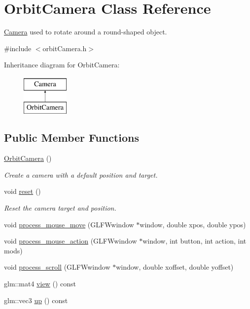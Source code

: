 \hypertarget{classOrbitCamera}{}\section{Orbit\+Camera Class Reference}
\label{classOrbitCamera}


\hyperlink{classCamera}{Camera} used to rotate around a round-\/shaped object.  




{\ttfamily \#include $<$orbit\+Camera.\+h$>$}

Inheritance diagram for Orbit\+Camera\+:\begin{figure}[H]
\begin{center}
\leavevmode
\includegraphics[height=2.000000cm]{classOrbitCamera}
\end{center}
\end{figure}
\subsection*{Public Member Functions}
\begin{DoxyCompactItemize}
\item 
\hyperlink{classOrbitCamera_ae87a8ab83042c47dac97a41ab4eb9e8c}{Orbit\+Camera} ()
\begin{DoxyCompactList}\small\item\em Create a camera with a default position and target. \end{DoxyCompactList}\item 
void \hyperlink{classOrbitCamera_a022751aa06693232844732adb00e7d71}{reset} ()
\begin{DoxyCompactList}\small\item\em Reset the camera target and position. \end{DoxyCompactList}\item 
void \hyperlink{classOrbitCamera_a73e280b9244dcbb6b8898a38d0243625}{process\+\_\+mouse\+\_\+move} (G\+L\+F\+Wwindow $\ast$window, double xpos, double ypos)
\item 
void \hyperlink{classOrbitCamera_af8cb999454725d091971106c4a7bf715}{process\+\_\+mouse\+\_\+action} (G\+L\+F\+Wwindow $\ast$window, int button, int action, int mods)
\item 
void \hyperlink{classOrbitCamera_a879faaab86c47e485e119d247279904f}{process\+\_\+scroll} (G\+L\+F\+Wwindow $\ast$window, double xoffset, double yoffset)
\item 
glm\+::mat4 \hyperlink{classOrbitCamera_a07595f9d11666c180934e47ba8abae73}{view} () const
\item 
glm\+::vec3 \hyperlink{classOrbitCamera_a1d65d137e3ef3f32c3b8eb31b49047fc}{up} () const
\end{DoxyCompactItemize}
